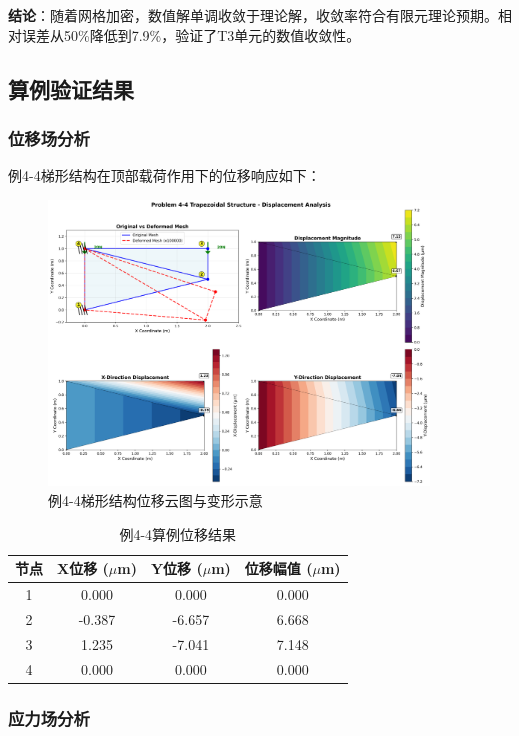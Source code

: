 \documentclass[12pt,a4paper]{article}
\begin{document}
\textbf{结论}：随着网格加密，数值解单调收敛于理论解，收敛率符合有限元理论预期。相对误差从50\%降低到7.9\%，验证了T3单元的数值收敛性。

\subsection{算例验证结果}

\subsubsection{位移场分析}

例4-4梯形结构在顶部载荷作用下的位移响应如下：

\begin{figure}[H]
\centering
\includegraphics[width=0.9\textwidth]{img/wzy_displacement_analysis.png}
\caption{例4-4梯形结构位移云图与变形示意}
\label{fig:wzy_displacement}
\end{figure}

\begin{table}[H]
\centering
\caption{例4-4算例位移结果}
\begin{tabular}{cccc}
\toprule
节点 & X位移 ($\mu$m) & Y位移 ($\mu$m) & 位移幅值 ($\mu$m) \\
\midrule
1 & 0.000 & 0.000 & 0.000 \\
2 & -0.387 & -6.657 & 6.668 \\
3 & 1.235 & -7.041 & 7.148 \\
4 & 0.000 & 0.000 & 0.000 \\
\bottomrule
\end{tabular}
\end{table}

\subsubsection{应力场分析}
\end{document}
